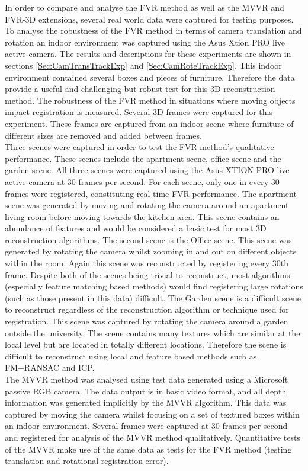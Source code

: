 
In order to compare and analyse the FVR method as well as the MVVR and FVR-3D extensions, several real world data were captured for testing purposes. To analyse the robustness of the FVR method in terms of camera translation and rotation an indoor environment was captured using the Asus Xtion PRO live active camera. The results and descriptions for these experiments are shown in sections \ref{Sec:CamTransTrackExp} and \ref{Sec:CamRoteTrackExp}. This indoor environment contained several boxes and pieces of furniture. Therefore the data provide a useful and challenging but robust test for this 3D reconstruction method. The robustness of the FVR method in situations where moving objects impact registration is measured. Several 3D frames were captured for this experiment. These frames are captured from an indoor scene where furniture of different sizes are removed and added between frames. \\

Three scenes were captured in order to test the FVR method's qualitative performance. These scenes include the apartment scene, office scene and the garden scene. All three scenes were captured using the Asus XTION PRO live active camera at 30 frames per second. For each scene, only one in every 30 frames were registered, constituting real time FVR performance. The apartment scene was generated by moving and rotating the camera around an apartment living room before moving towards the kitchen area. This scene contains an abundance of features and would be considered a basic test for most 3D reconstruction algorithms. The second scene is the Office scene. This scene was generated by rotating the camera whilst zooming in and out on different objects within the room. Again this scene was reconstructed by registering every 30th frame. Despite both of the scenes being trivial to reconstruct, most algorithms (especially feature matching based methods) would find registering large rotations (such as those present in this data) difficult. The Garden scene is a difficult scene to reconstruct regardless of the reconstruction algorithm or technique used for registration. This scene was captured by rotating the camera around a garden outside the university. The scene contains many textures which are similar at the local level but are located in totally different locations. Therefore the scene is difficult to reconstruct using local and feature based methods such as FM+RANSAC and ICP. \\

The MVVR method was analysed using test data generated using a Microsoft passive RGB camera. The data output is in basic video format, and all depth information was generated implicitly by the MVVR algorithm. This data was captured by moving the camera whilst focusing on a set of textured boxes within an indoor environment. Several frames were captured at 30 frames per second and registered for analysis of the MVVR method qualitatively. Quantitative tests of the MVVR make use of the same data as tests for the FVR method (testing translation and rotational registration error). \\

